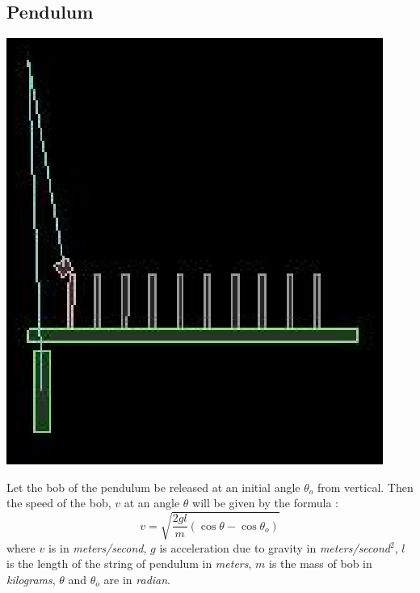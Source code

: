 \documentclass[11pt]{article}
\begin{document}
\subsection{Pendulum}
\begin{center}
\includegraphics[scale=0.5]{pendulum}
\end{center}
Let the bob of the pendulum\cite{pendulum} be released at an initial angle $\theta_o$  from vertical. Then the speed of the bob, $v$ at an angle $\theta$  will be given by the formula :
\begin{equation}
                                                  v = \sqrt{\frac{2gl}{m}(\cos\theta - \cos\theta_o)}
\end{equation}
where $v$ is in \emph{meters/second}, $g$ is acceleration due to gravity in \emph{meters/second$^2$}, $l$ is the length of the string of pendulum in \emph{meters}, $m$ is the mass of bob in \emph{kilograms}, $\theta$ and $\theta_o$ are in \emph{radian}.
\end{document}
